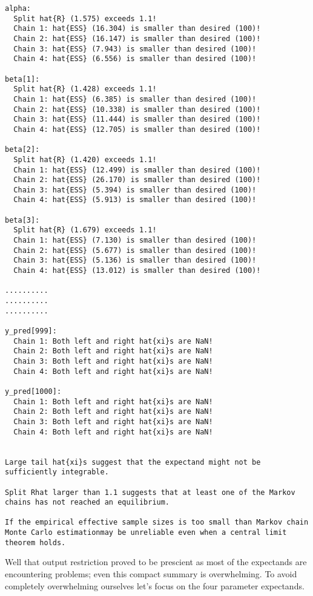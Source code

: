 \documentclass[
  letterpaper,
  DIV=11,
  numbers=noendperiod]{scrartcl}
\begin{document}
\begin{verbatim}
alpha:
  Split hat{R} (1.575) exceeds 1.1!
  Chain 1: hat{ESS} (16.304) is smaller than desired (100)!
  Chain 2: hat{ESS} (16.147) is smaller than desired (100)!
  Chain 3: hat{ESS} (7.943) is smaller than desired (100)!
  Chain 4: hat{ESS} (6.556) is smaller than desired (100)!

beta[1]:
  Split hat{R} (1.428) exceeds 1.1!
  Chain 1: hat{ESS} (6.385) is smaller than desired (100)!
  Chain 2: hat{ESS} (10.338) is smaller than desired (100)!
  Chain 3: hat{ESS} (11.444) is smaller than desired (100)!
  Chain 4: hat{ESS} (12.705) is smaller than desired (100)!

beta[2]:
  Split hat{R} (1.420) exceeds 1.1!
  Chain 1: hat{ESS} (12.499) is smaller than desired (100)!
  Chain 2: hat{ESS} (26.170) is smaller than desired (100)!
  Chain 3: hat{ESS} (5.394) is smaller than desired (100)!
  Chain 4: hat{ESS} (5.913) is smaller than desired (100)!

beta[3]:
  Split hat{R} (1.679) exceeds 1.1!
  Chain 1: hat{ESS} (7.130) is smaller than desired (100)!
  Chain 2: hat{ESS} (5.677) is smaller than desired (100)!
  Chain 3: hat{ESS} (5.136) is smaller than desired (100)!
  Chain 4: hat{ESS} (13.012) is smaller than desired (100)!

..........
..........
..........

y_pred[999]:
  Chain 1: Both left and right hat{xi}s are NaN!
  Chain 2: Both left and right hat{xi}s are NaN!
  Chain 3: Both left and right hat{xi}s are NaN!
  Chain 4: Both left and right hat{xi}s are NaN!

y_pred[1000]:
  Chain 1: Both left and right hat{xi}s are NaN!
  Chain 2: Both left and right hat{xi}s are NaN!
  Chain 3: Both left and right hat{xi}s are NaN!
  Chain 4: Both left and right hat{xi}s are NaN!


Large tail hat{xi}s suggest that the expectand might not be
sufficiently integrable.

Split Rhat larger than 1.1 suggests that at least one of the Markov
chains has not reached an equilibrium.

If the empirical effective sample sizes is too small than Markov chain
Monte Carlo estimationmay be unreliable even when a central limit
theorem holds.
\end{verbatim}

Well that output restriction proved to be prescient as most of the
expectands are encountering problems; even this compact summary is
overwhelming. To avoid completely overwhelming ourselves let's focus on
the four parameter expectands.
\end{document}
